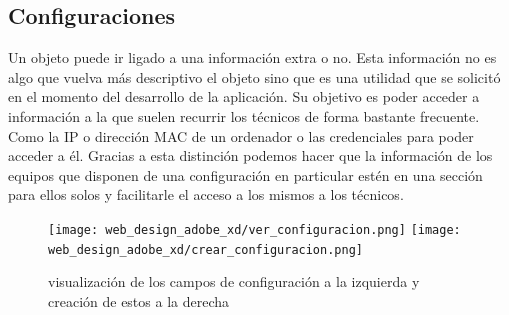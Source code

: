 \subsection{Configuraciones}

Un objeto puede ir ligado a una información extra o no. Esta información no es algo que vuelva más descriptivo el objeto sino que es una utilidad que se solicitó en el momento del desarrollo de la aplicación. Su objetivo es poder acceder a información a la que suelen recurrir los técnicos de forma bastante frecuente. Como la IP o dirección MAC de un ordenador o las credenciales para poder acceder a él. Gracias a esta distinción podemos hacer que la información de los equipos que disponen de una configuración en particular estén en una sección para ellos solos y facilitarle el acceso a los mismos a los técnicos.

\begin{figure}[htbp]
    \centering
        \texttt{[image: web\_design\_adobe\_xd/ver\_configuracion.png]}
        \texttt{[image: web\_design\_adobe\_xd/crear\_configuracion.png]}
        \caption{visualización de los campos de configuración a la izquierda y creación de estos a la derecha}
\end{figure}